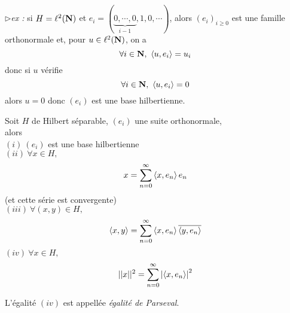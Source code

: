 \documentclass[a4paper,11pt, twoside]{article}
\begin{document}
$\triangleright$\emph{ex : }si $H=\ell^2(\mathbf N)$ et $e_i=(\underbrace{0,\cdots,0}_{i-1},1,0,\cdots)$, alors $(e_i)_{i\geqslant 0}$ est une famille orthonormale et, pour $u\in\ell^2(\mathbf N)$, on a 
$$\forall i\in \mathbf N,\ \left\langle u,e_i \right\rangle=u_i$$
donc si $u$ vérifie 
$$\forall i\in \N,\ \ps{u,e_i}=0$$
alors $u=0$ donc $(e_i)$ est une base hilbertienne.


\begin{Th}
  Soit $H$ de Hilbert séparable, $(e_i)$ une suite orthonormale,\\

  alors \lasse\\
  $(i)\ (e_i)$ est une base hilbertienne\\
  $(ii)\ \forall x\in H,$ 
  $$x=\sum_{n=0}^\infty\left\langle x,e_n \right\rangle e_n$$
  (et cette série est convergente)\\
  $(iii)\ \forall (x,y)\in H,$
  $$\left\langle x,y \right\rangle=\sum_{n=0}^\infty\left\langle x,e_n \right\rangle\overline{\left\langle y,e_n \right\rangle}$$
  $(iv)\ \forall x\in H,$ 
  $$||x||^2=\sum_{n=0}^\infty\left| \left\langle x,e_n \right\rangle\right|^2$$
\end{Th}


\begin{RQ}
  L'égalité $(iv)$ est appellée \emph{égalité de Parseval}.
\end{RQ}
\end{document}
